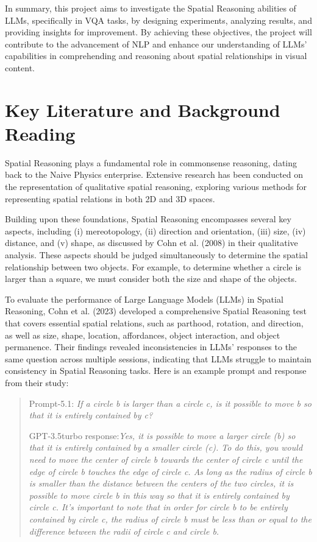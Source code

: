 \documentclass[journal,10pt]{IEEEtran}
\begin{document}
In summary, this project aims to investigate the Spatial Reasoning abilities of LLMs, specifically in VQA tasks, by designing experiments, analyzing results, and providing insights for improvement. By achieving these objectives, the project will contribute to the advancement of NLP and enhance our understanding of LLMs' capabilities in comprehending and reasoning about spatial relationships in visual content.

\section{Key Literature and Background Reading}

Spatial Reasoning plays a fundamental role in commonsense reasoning, dating back to the Naive Physics enterprise\cite{Hobbs1985-HOBFTO}. Extensive research has been conducted on the representation of qualitative spatial reasoning\cite{chen2015survey}, exploring various methods for representing spatial relations in both 2D and 3D spaces.


Building upon these foundations, Spatial Reasoning encompasses several key aspects, including (i) mereotopology, (ii) direction and orientation, (iii) size, (iv) distance, and (v) shape, as discussed by Cohn et al. (2008) in their qualitative analysis\cite{cohn2008qualitative}. These aspects should be judged simultaneously to determine the spatial relationship between two objects. For example, to determine whether a circle is larger than a square, we must consider both the size and shape of the objects. 

To evaluate the performance of Large Language Models (LLMs) in Spatial Reasoning, Cohn et al. (2023) developed a comprehensive Spatial Reasoning test that covers essential spatial relations, such as parthood, rotation, and direction, as well as size, shape, location, affordances, object interaction, and object permanence\cite{cohn2023dialectical}. Their findings revealed inconsistencies in LLMs' responses to the same question across multiple sessions, indicating that LLMs struggle to maintain consistency in Spatial Reasoning tasks. Here is an example prompt and response from their study:
\begin{quotation}
    Prompt-5.1: \emph{If a circle b is larger than a circle c, is it possible to move b so that it is entirely contained by c?}

    GPT-3.5turbo response:\emph{Yes, it is possible to move a larger circle (b) so that it is entirely contained by a smaller circle (c). To do this, you would need to move the 
    center of circle b towards the center of circle c until the edge of circle b touches the edge of circle c. As long as the radius of circle b is smaller than the distance between the centers of the two circles, it is possible to move circle b in this way so that it is entirely contained by circle c. It’s important to note that in order for circle b to be entirely contained by circle c, the radius of circle b must be less than or equal to the 
    difference between the radii of circle c and circle b.}
\end{quotation}
\end{document}
